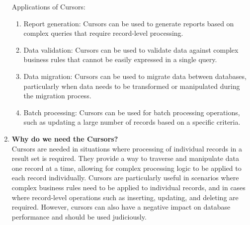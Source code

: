 \documentclass[11pt]{article}
\begin{document}
\begin{enumerate}
          Applications of Cursors:
          \begin{enumerate}
              \item Report generation: Cursors can be used to generate reports based on complex queries that require record-level processing.
              \item Data validation: Cursors can be used to validate data against complex business rules that cannot be easily expressed in a single query.
              \item Data migration: Cursors can be used to migrate data between databases, particularly when data needs to be transformed or manipulated during the migration process.
              \item Batch processing: Cursors can be used for batch processing operations, such as updating a large number of records based on a specific criteria.
          \end{enumerate}

    \item \textbf{Why do we need the Cursors?}\\

          Cursors are needed in situations where processing of individual records in a result set is required. They provide a way to traverse and manipulate data one record at a time, allowing for complex processing logic to be applied to each record individually. Cursors are particularly useful in scenarios where complex business rules need to be applied to individual records, and in cases where record-level operations such as inserting, updating, and deleting are required. However, cursors can also have a negative impact on database performance and should be used judiciously.
\end{enumerate}
\end{document}
